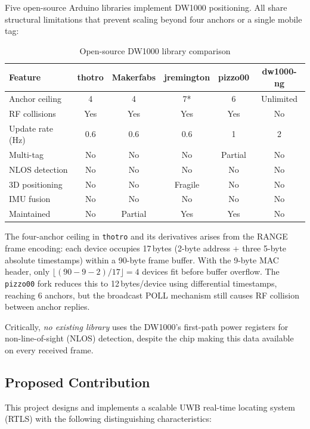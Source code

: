 \documentclass[11pt,a4paper]{article}
\begin{document}
Five open-source Arduino libraries implement DW1000 positioning. All share structural limitations that prevent scaling beyond four anchors or a single mobile tag:

\begin{table}[ht]
\centering
\caption{Open-source DW1000 library comparison}
\begin{tabular}{lccccc}
\toprule
\textbf{Feature} & \textbf{thotro} & \textbf{Makerfabs} & \textbf{jremington} & \textbf{pizzo00} & \textbf{dw1000-ng} \\
\midrule
Anchor ceiling         & 4  & 4  & 7* & 6  & Unlimited \\
RF collisions          & Yes & Yes & Yes & Yes & No \\
Update rate (Hz)       & 0.6 & 0.6 & 0.6 & 1 & 2 \\
Multi-tag              & No & No & No & Partial & No \\
NLOS detection         & No & No & No & No & No \\
3D positioning         & No & No & Fragile & No & No \\
IMU fusion             & No & No & No & No & No \\
Maintained             & No & Partial & Yes & Yes & No \\
\bottomrule
\end{tabular}
\end{table}

The four-anchor ceiling in \texttt{thotro} and its derivatives arises from the RANGE frame encoding: each device occupies 17\,bytes (2-byte address + three 5-byte absolute timestamps) within a 90-byte frame buffer. With the 9-byte MAC header, only $\lfloor(90-9-2)/17\rfloor = 4$ devices fit before buffer overflow. The \texttt{pizzo00} fork reduces this to 12\,bytes/device using differential timestamps, reaching 6 anchors, but the broadcast POLL mechanism still causes RF collision between anchor replies.

Critically, \emph{no existing library} uses the DW1000's first-path power registers for non-line-of-sight (NLOS) detection, despite the chip making this data available on every received frame.

\subsection{Proposed Contribution}

This project designs and implements a scalable UWB real-time locating system (RTLS) with the following distinguishing characteristics:
\end{document}
